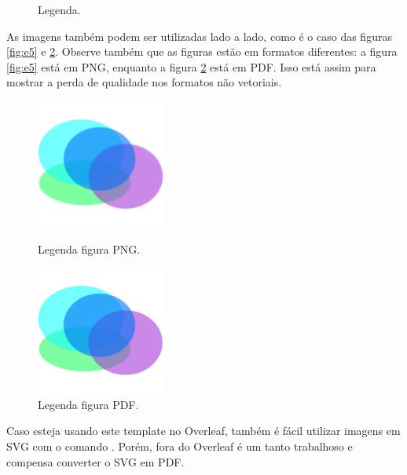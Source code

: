 
    \begin{figure}[htb]
        \centering
        
        \caption{Legenda.}
        \label{fig:e4}
    \end{figure}

    As imagens também podem ser utilizadas lado a lado, como é o caso das figuras \ref{fig:e5} e \ref{fig:e6}.
    Observe também que as figuras estão em formatos diferentes: a figura \ref{fig:e5} está em PNG, enquanto a figura \ref{fig:e6} está em PDF.
    Isso está assim para mostrar a perda de qualidade nos formatos não vetoriais.


    \begin{figure}[htb]
        \centering
        \begin{minipage}{7.5cm}
            \centering
            \includegraphics[width=120pt]{images/figure.png}
            \caption{Legenda figura PNG.}
            \label{fig:e5}
        \end{minipage}
        \hfill
        \begin{minipage}{7.5cm}
            \centering
            \includegraphics[width=120pt]{images/figure.pdf}
            \caption{Legenda figura PDF.}
            \label{fig:e6}
        \end{minipage}
    \end{figure}

    Caso esteja usando este template no Overleaf, também é fácil utilizar imagens em SVG com o comando \lstinline[language=TeX, style=Code]||.
    Porém, fora do Overleaf é um tanto trabalhoso e compensa converter o SVG em PDF.

